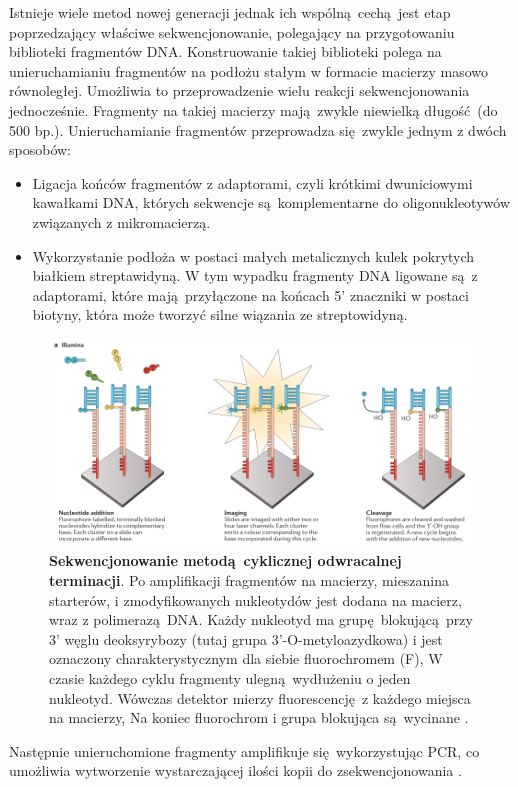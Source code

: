 \documentclass[two column, twoside, a4paper]{article}
\begin{document}
Istnieje wiele metod nowej generacji jednak ich wspólną cechą jest etap poprzedzający właściwe sekwencjonowanie, polegający na przygotowaniu biblioteki fragmentów DNA. Konstruowanie takiej biblioteki polega na unieruchamianiu fragmentów na podłożu stałym w formacie macierzy masowo równoległej. Umożliwia to przeprowadzenie wielu reakcji sekwencjonowania jednocześnie. Fragmenty na takiej macierzy mają zwykle niewielką długość (do 500 bp.). Unieruchamianie fragmentów przeprowadza się zwykle jednym z dwóch sposobów:
\begin{itemize}
	\item Ligacja końców fragmentów z adaptorami, czyli krótkimi dwuniciowymi kawałkami DNA, których sekwencje są komplementarne do oligonukleotywów związanych z mikromacierzą.
	\item Wykorzystanie podłoża w postaci małych metalicznych kulek pokrytych białkiem streptawidyną. W tym wypadku fragmenty DNA ligowane są z adaptorami, które mają przyłączone na końcach 5' znaczniki w postaci biotyny, która może tworzyć silne wiązania ze streptowidyną.
\end{itemize}
\begin{figure}[btp]
	\begin{tcolorbox}
		\centering
		\includegraphics[width=\textwidth]{./figury/illumina.png}
		\caption{\textbf{Sekwencjonowanie metodą cyklicznej odwracalnej terminacji}. Po amplifikacji fragmentów na macierzy, mieszanina starterów, i zmodyfikowanych nukleotydów jest dodana na macierz, wraz z polimerazą DNA. Każdy nukleotyd ma grupę blokującą przy 3' węglu deoksyrybozy (tutaj grupa 3'-O-metyloazydkowa) i jest oznaczony charakterystycznym dla siebie fluorochromem (F),  W czasie każdego cyklu fragmenty ulegną wydłużeniu o jeden nukleotyd. Wówczas detektor mierzy fluorescencję z każdego miejsca na macierzy, Na koniec fluorochrom i grupa blokująca są wycinane \autocite{Godwin2016}.}\label{fig::illumina}
	\end{tcolorbox}
\end{figure}
Następnie unieruchomione fragmenty amplifikuje się wykorzystując PCR, co umożliwia wytworzenie wystarczającej ilości kopii do zsekwencjonowania \autocite{Godwin2016}\autocite{Brown2019}.
\end{document}

